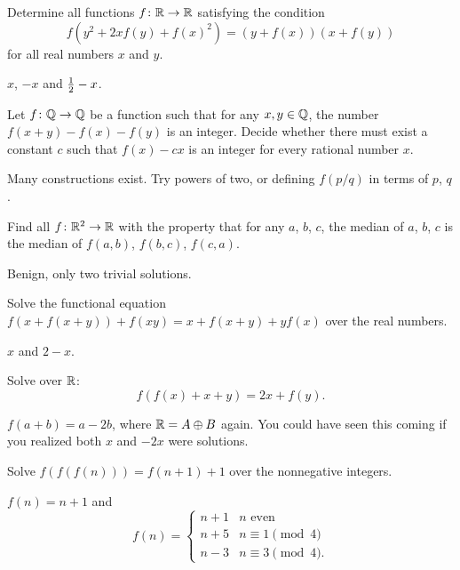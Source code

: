 \documentclass[11pt]{scrartcl}
\begin{document}
\begin{problem}
  [EGMO 2012/6]
  Determine all functions $f \colon \mathbb R \to \mathbb R$ satisfying the condition
  \[f(y^2+2xf(y)+f(x)^2)=(y+f(x))(x+f(y))\]
  for all real numbers $x$ and $y$.
  \begin{hint}
    $x$, $-x$ and $\frac{1}{2} - x$.
  \end{hint}
\end{problem}

\begin{problem}
  Let $f \colon \mathbb Q \to \mathbb Q$ be a function such that for any $x,y \in \mathbb Q$,
  the number $f(x+y)-f(x)-f(y)$ is an integer.
  Decide whether there must exist a constant $c$ such that $f(x) - cx$
  is an integer for every rational number $x$.
  \begin{hint}
    Many constructions exist. Try powers of two, or defining $f(p/q)$ in terms of $p$, $q$.
  \end{hint}
\end{problem}

\begin{problem}
  [TSTST 2011/1]
  Find all $f \colon \mathbb R^2 \to \mathbb R$ with the property that for any $a$, $b$, $c$,
  the median of $a$, $b$, $c$ is the median of $f(a,b)$, $f(b,c)$, $f(c,a)$.
  \begin{hint}
    Benign, only two trivial solutions.
  \end{hint}
\end{problem}

\begin{problem}
  [IMO 2015/5]
  Solve the functional equation $f(x+f(x+y)) + f(xy) = x + f(x+y) + yf(x)$
  over the real numbers.
  \begin{hint}
    $x$ and $2-x$.
  \end{hint}
\end{problem}

\begin{problem}
  [Kazakhstan 2005]
  \label{prob:kaz}
  Solve over $\mathbb R$: \[ f(f(x)+x+y)=2x+f(y). \]
  \begin{hint}
    $f(a+b) = a-2b$, where $\mathbb R = A \oplus B$ again.
    You could have seen this coming if you realized both $x$ and $-2x$ were solutions.
  \end{hint}
\end{problem}

\begin{problem}
  [Shortlist 2013 A5]
  Solve $f(f(f(n))) = f(n+1)+1$ over the nonnegative integers.
  \begin{hint}
    $f(n) = n+1$ and \[
      f(n) = \begin{cases}
        n+1 & n \text{ even} \\
        n+5 & n \equiv 1 \pmod 4 \\
        n-3 & n\equiv 3 \pmod 4.
      \end{cases} \]
  \end{hint}
\end{problem}
\end{document}
